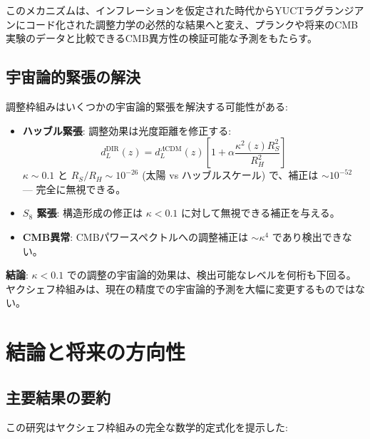 \documentclass[11pt,a4paper]{article}
\begin{document}
	このメカニズムは、インフレーションを仮定された時代からYUCTラグランジアンにコード化された調整力学の必然的な結果へと変え、プランクや将来のCMB実験のデータと比較できるCMB異方性の検証可能な予測をもたらす。
	
	\subsection{宇宙論的緊張の解決}
	
	調整枠組みはいくつかの宇宙論的緊張を解決する可能性がある:
	
	\begin{itemize}
		\item \textbf{ハッブル緊張}: 調整効果は光度距離を修正する:
		\begin{equation}
			d_L^{\text{DIR}}(z) = d_L^{\Lambda\text{CDM}}(z) \left[ 1 + \alpha \frac{\kappa^2(z) R_S^2}{R_H^2} \right]
		\end{equation}
		$\kappa \sim 0.1$ と $R_S/R_H \sim 10^{-26}$ (太陽 vs ハッブルスケール) で、補正は $\sim 10^{-52}$ — 完全に無視できる。
		
		\item \textbf{$S_8$ 緊張}: 構造形成の修正は $\kappa < 0.1$ に対して無視できる補正を与える。
		
		\item \textbf{CMB異常}: CMBパワースペクトルへの調整補正は $\sim \kappa^4$ であり検出できない。
	\end{itemize}
	
	\textbf{結論}: $\kappa < 0.1$ での調整の宇宙論的効果は、検出可能なレベルを何桁も下回る。ヤクシェフ枠組みは、現在の精度での宇宙論的予測を大幅に変更するものではない。
	
	\section{結論と将来の方向性}
	\subsection{主要結果の要約}
	
	この研究はヤクシェフ枠組みの完全な数学的定式化を提示した:
	
\end{document}
